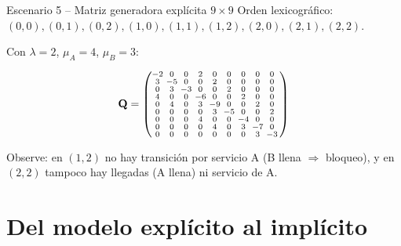 \documentclass[aspectratio=1610, 9pt]{beamer}
\begin{document}
\begin{frame}{Escenario 5 -- Matriz generadora expl\'icita $9\times 9$}
Orden lexicogr\'afico: $(0,0),(0,1),(0,2),(1,0),(1,1),(1,2),(2,0),(2,1),(2,2)$.

\vspace{2pt}
Con $\lambda=2$, $\mu_A=4$, $\mu_B=3$:

\[
\mathbf{Q} = \left(\!\begin{smallmatrix}
-2 & 0 & 0 & 2 & 0 & 0 & 0 & 0 & 0 \\
3 & -5 & 0 & 0 & 2 & 0 & 0 & 0 & 0 \\
0 & 3 & -3 & 0 & 0 & 2 & 0 & 0 & 0 \\
4 & 0 & 0 & -6 & 0 & 0 & 2 & 0 & 0 \\
0 & 4 & 0 & 3 & -9 & 0 & 0 & 2 & 0 \\
0 & 0 & 0 & 0 & 3 & -5 & 0 & 0 & 2 \\
0 & 0 & 0 & 4 & 0 & 0 & -4 & 0 & 0 \\
0 & 0 & 0 & 0 & 4 & 0 & 3 & -7 & 0 \\
0 & 0 & 0 & 0 & 0 & 0 & 0 & 3 & -3
\end{smallmatrix}\right)
\]

\vspace{6pt}
\small Observe: en $(1,2)$ no hay transici\'on por servicio A (B llena $\Rightarrow$ bloqueo), y en $(2,2)$ tampoco hay llegadas (A llena) ni servicio de A.
\end{frame}

\section{Del modelo expl\'icito al impl\'icito}
\end{document}
